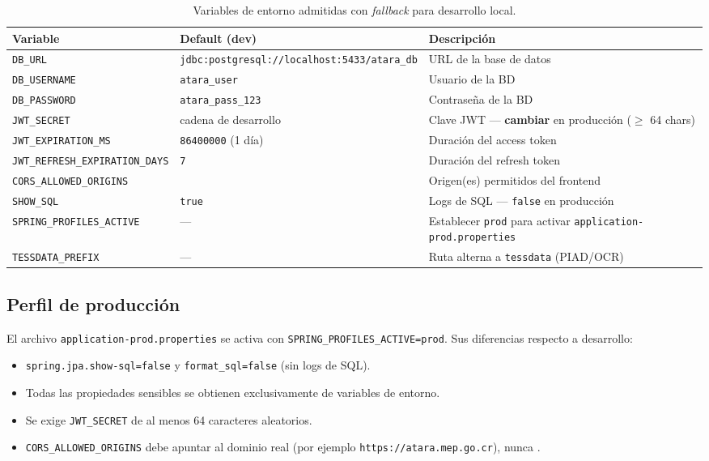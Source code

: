 \documentclass[11pt,a4paper,oneside]{article}
\newcommand{\code}[1]{\texttt{\small #1}}
\begin{document}
\begin{table}[h]\centering\small\renewcommand{\arraystretch}{1.15}
\begin{tabular}{@{}p{4.4cm} p{4.0cm} p{6.5cm}@{}}
\toprule
\textbf{Variable} & \textbf{Default (dev)} & \textbf{Descripción} \\
\midrule
\code{DB\_URL}                       & \code{jdbc:postgresql://localhost:5433/atara\_db} & URL de la base de datos \\
\code{DB\_USERNAME}                  & \code{atara\_user}              & Usuario de la BD \\
\code{DB\_PASSWORD}                  & \code{atara\_pass\_123}         & Contraseña de la BD \\
\code{JWT\_SECRET}                   & cadena de desarrollo            & Clave JWT — \textbf{cambiar} en producción ($\geq$ 64 chars) \\
\code{JWT\_EXPIRATION\_MS}           & \code{86400000} (1 día)          & Duración del access token \\
\code{JWT\_REFRESH\_EXPIRATION\_DAYS}& \code{7}                         & Duración del refresh token \\
\code{CORS\_ALLOWED\_ORIGINS}        & \code{*}                         & Origen(es) permitidos del frontend \\
\code{SHOW\_SQL}                     & \code{true}                     & Logs de SQL — \code{false} en producción \\
\code{SPRING\_PROFILES\_ACTIVE}      & ---                              & Establecer \code{prod} para activar \code{application-prod.properties} \\
\code{TESSDATA\_PREFIX}              & ---                              & Ruta alterna a \code{tessdata} (PIAD/OCR) \\
\bottomrule
\end{tabular}
\caption{Variables de entorno admitidas con \emph{fallback} para desarrollo local.}
\end{table}

\subsection{Perfil de producción}

El archivo \code{application-prod.properties} se activa con
\code{SPRING\_PROFILES\_ACTIVE=prod}. Sus diferencias respecto a desarrollo:

\begin{itemize}[leftmargin=*]
  \item \code{spring.jpa.show-sql=false} y \code{format\_sql=false} (sin logs de SQL).
  \item Todas las propiedades sensibles se obtienen exclusivamente de variables de entorno.
  \item Se exige \code{JWT\_SECRET} de al menos 64 caracteres aleatorios.
  \item \code{CORS\_ALLOWED\_ORIGINS} debe apuntar al dominio real (por ejemplo
        \code{https://atara.mep.go.cr}), nunca \code{*}.
\end{itemize}
\end{document}
